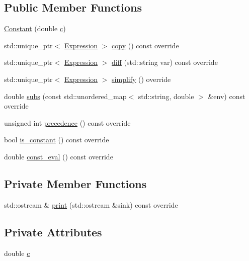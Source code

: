 \subsection*{Public Member Functions}
\begin{DoxyCompactItemize}
\item 
\hyperlink{classsymcpp_1_1Constant_a634c91ce129b22e1b9b9afe13d4c8753}{Constant} (double \hyperlink{classsymcpp_1_1Constant_aff65de7395c014b7544c285bc131b336}{c})
\item 
std\+::unique\+\_\+ptr$<$ \hyperlink{classsymcpp_1_1Expression}{Expression} $>$ \hyperlink{classsymcpp_1_1Constant_aa5a5b0f6f06e6017ed641e8b89cd0cef}{copy} () const override
\item 
std\+::unique\+\_\+ptr$<$ \hyperlink{classsymcpp_1_1Expression}{Expression} $>$ \hyperlink{classsymcpp_1_1Constant_a19dd15712ce8630b758766e6478dec58}{diff} (std\+::string var) const override
\item 
std\+::unique\+\_\+ptr$<$ \hyperlink{classsymcpp_1_1Expression}{Expression} $>$ \hyperlink{classsymcpp_1_1Constant_a082044c6d521c2d31bbadd5db6354f96}{simplify} () override
\item 
double \hyperlink{classsymcpp_1_1Constant_ac6f62c3945429d0d318dc7d366dd4b54}{subs} (const std\+::unordered\+\_\+map$<$ std\+::string, double $>$ \&env) const override
\item 
unsigned int \hyperlink{classsymcpp_1_1Constant_a8c5e1e1b0cb2131d6f20b118f32a223f}{precedence} () const override
\item 
bool \hyperlink{classsymcpp_1_1Constant_af1ae4532a85ec5c5ed55ed8d69be68b3}{is\+\_\+constant} () const override
\item 
double \hyperlink{classsymcpp_1_1Constant_a9c2a9089ae171c2403e053a566929b45}{const\+\_\+eval} () const override
\end{DoxyCompactItemize}
\subsection*{Private Member Functions}
\begin{DoxyCompactItemize}
\item 
std\+::ostream \& \hyperlink{classsymcpp_1_1Constant_aca89e2af8df740dba562776e389edab6}{print} (std\+::ostream \&sink) const override
\end{DoxyCompactItemize}
\subsection*{Private Attributes}
\begin{DoxyCompactItemize}
\item 
double \hyperlink{classsymcpp_1_1Constant_aff65de7395c014b7544c285bc131b336}{c}
\end{DoxyCompactItemize}


